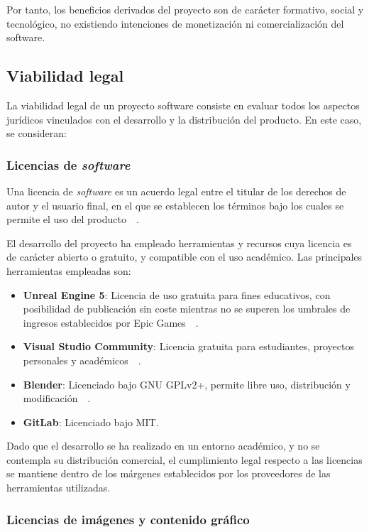 \begin{itemize}
Por tanto, los beneficios derivados del proyecto son de carácter formativo, social y tecnológico, no existiendo intenciones de monetización ni comercialización del software.


\subsection{Viabilidad legal}
La viabilidad legal de un proyecto software consiste en evaluar todos los aspectos jurídicos vinculados con el desarrollo y la distribución del producto. En este caso, se consideran:

\subsubsection{Licencias de \textit{software}}

Una licencia de \textit{software} es un acuerdo legal entre el titular de los derechos de autor y el usuario final, en el que se establecen los términos bajo los cuales se permite el uso del producto~~\cite{licenciaQueEs}.

El desarrollo del proyecto ha empleado herramientas y recursos cuya licencia es de carácter abierto o gratuito, y compatible con el uso académico. Las principales herramientas empleadas son:

\begin{itemize}
  \item \textbf{Unreal Engine 5}: Licencia de uso gratuita para fines educativos, con posibilidad de publicación sin coste mientras no se superen los umbrales de ingresos establecidos por Epic Games~~\cite{unrealLicense}.
  \item \textbf{Visual Studio Community}: Licencia gratuita para estudiantes, proyectos personales y académicos~~\cite{vslicense}.
  \item \textbf{Blender}: Licenciado bajo GNU GPLv2+, permite libre uso, distribución y modificación~~\cite{blenderlicense}.
  \item \textbf{GitLab}: Licenciado bajo MIT.
\end{itemize}

Dado que el desarrollo se ha realizado en un entorno académico, y no se contempla su distribución comercial, el cumplimiento legal respecto a las licencias se mantiene dentro de los márgenes establecidos por los proveedores de las herramientas utilizadas.

\subsubsection{Licencias de imágenes y contenido gráfico}


\end{itemize}
